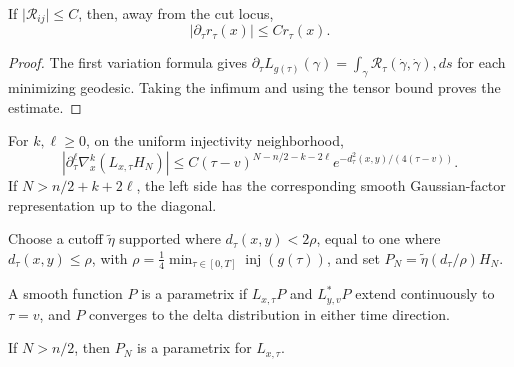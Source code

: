 \begin{lemma}
\label{lem:chow-iii-changing-distance-bound}
If \(\lvert\mathcal R_{ij}\rvert\le C\), then, away from the cut locus,
\[
 \left|\partial_\tau r_\tau(x)\right|\le C r_\tau(x).
\]
\end{lemma}
\begin{proof}
\sketch The first variation formula gives
\(
 \partial_\tau L_{g(\tau)}(\gamma)
 =\int_\gamma\mathcal R_\tau(\dot\gamma,\dot\gamma),ds
\)
for each minimizing geodesic.  Taking the infimum and using the tensor bound
proves the estimate.
\end{proof}

\begin{lemma}
\label{lem:chow-iii-approximate-kernel-error-derivatives}
For \(k,\ell\ge0\), on the uniform injectivity neighborhood,
\[
 \left|\partial_\tau^\ell\nabla_x^k(L_{x,\tau}H_N)\right|
 \le C(\tau-v)^{N-n/2-k-2\ell}
 e^{-d_\tau^2(x,y)/(4(\tau-v))}.
\]
If \(N>n/2+k+2\ell\), the left side has the corresponding smooth
Gaussian-factor representation up to the diagonal.
\end{lemma}

Choose a cutoff \(\widetilde\eta\) supported where \(d_\tau(x,y)<2\rho\),
equal to one where \(d_\tau(x,y)\le\rho\), with
\(
 \rho=\frac14\min_{\tau\in[0,T]}\operatorname{inj}(g(\tau))
\), and set \(P_N=\widetilde\eta(d_\tau/\rho)H_N\).

\begin{definition}
\label{def:chow-iii-evolving-parametrix}
A smooth function \(P\) is a parametrix if \(L_{x,\tau}P\) and
\(L^*_{y,v}P\) extend continuously to \(\tau=v\), and \(P\) converges to the
delta distribution in either time direction.
\end{definition}

\begin{proposition}
\label{prop:chow-iii-evolving-parametrix}
If \(N>n/2\), then \(P_N\) is a parametrix for \(L_{x,\tau}\).
\end{proposition}

